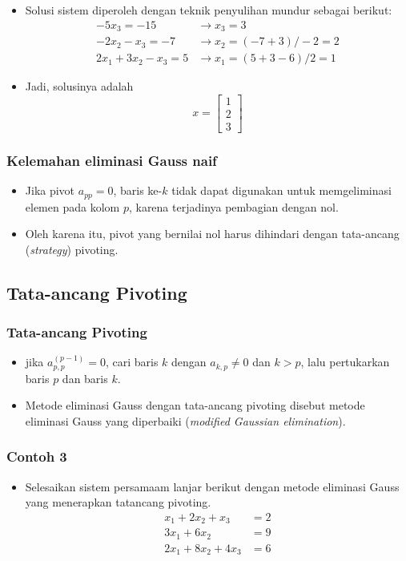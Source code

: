 \documentclass[pdflatex,compress,mathserif]{beamer}
\begin{document}
\begin{frame}
	\begin{itemize}
		\item Solusi sistem diperoleh dengan teknik penyulihan mundur sebagai berikut:
		\begin{align*}
			-5x_3 = -15 &\rightarrow x_3 = 3 \\
			-2x_2 - x_3 = -7 &\rightarrow x_2 = (-7 + 3)/-2 = 2 \\
			2x_1 + 3x_2 - x_3 = 5 &\rightarrow x_1 = (5 + 3 - 6)/2 = 1
		\end{align*}
		\item Jadi, solusinya adalah \[ x = 
		\begin{bmatrix}
		1 \\ 2 \\ 3 
		\end{bmatrix} \]
	\end{itemize}
\end{frame}

\begin{frame}
	\frametitle{Kelemahan eliminasi Gauss naif}
	\begin{itemize}
		\item Jika pivot $ a_{pp} = 0 $, baris ke-$ k $ tidak dapat digunakan untuk memgeliminasi elemen pada kolom $ p $, karena terjadinya pembagian dengan nol.
		\item Oleh karena itu, pivot yang bernilai nol harus dihindari dengan tata-ancang (\textit{strategy}) pivoting.
	\end{itemize}
\end{frame}

\subsection{Tata-ancang Pivoting}

\begin{frame}
	\frametitle{Tata-ancang Pivoting}
	\begin{itemize}
		\item jika $ a_{p,p}^{(p-1)} = 0 $, cari baris $ k $ dengan $ a_{k,p} \neq 0 $ dan $ k > p $, lalu pertukarkan baris $ p $ dan baris $ k $.
		\item Metode eliminasi Gauss dengan tata-ancang pivoting disebut metode eliminasi Gauss yang diperbaiki (\textit{modified Gaussian elimination}).
	\end{itemize}
\end{frame}

\begin{frame}
	\frametitle{Contoh 3}
	\begin{itemize}
		\item Selesaikan sistem persamaam lanjar berikut dengan metode eliminasi Gauss yang menerapkan tatancang pivoting.
		\begin{align*}
			x_1 + 2x_2 + x_3 &= 2 \\
			3x_1 + 6x_2 &= 9 \\
			2x_1 + 8x_2 + 4x_3 &= 6
		\end{align*}
	\end{itemize}
\end{frame}
\end{document}
